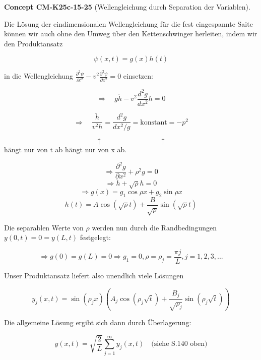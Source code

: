 \documentclass[10pt, letterpaper]{article}
\newcommand{\CustomHeading}[3]{%
  \par\medskip\noindent%
  \textbf{#1 #2} \textnormal{(#3)}.\enskip%
}
\newenvironment{CONC}[2]{\CustomHeading{Concept}{#1}{#2}}{}
\begin{document}
\begin{CONC}{CM-K25c-15-25}{Wellengleichung durch Separation der Variablen}
Die Lösung der eindimensionalen Wellengleichung für die fest eingespannte Saite können wir auch ohne den Umweg über den Kettenschwinger herleiten, indem wir den Produktansatz

\[\psi(x,t) = g(x)h(t)\]

in die Wellengleichung $\frac{\partial^2\psi}{\partial t^2} - v^2\frac{\partial^2\psi}{\partial x^2} = 0$ einsetzen:

\[\Rightarrow \quad g\ddot{h} - v^2\frac{d^2g}{dx^2}h = 0\]

\[\Rightarrow \quad \frac{\ddot{h}}{v^2h} = \frac{d^2g}{dx^2/g} = \text{konstant} = -p^2\]

\[\uparrow \qquad\qquad\qquad\qquad \uparrow\]
hängt nur von t ab \qquad hängt nur von x ab.

\[
\Rightarrow \frac{\partial^2 g}{\partial x^2} + \rho^2 g = 0
\]
\[
\Rightarrow \ddot{h} + \sqrt{\rho} h = 0
\]
\[
\Rightarrow g(x) = g_1 \cos \rho x + g_2 \sin \rho x
\]
\[
h(t) = A \cos(\sqrt{\rho}t) + \frac{B}{\sqrt{\rho}} \sin(\sqrt{\rho}t)
\]

Die separablen Werte von $\rho$ werden nun durch die Randbedingungen $y(0,t) = 0 = y(L,t)$ festgelegt:

\[
\Rightarrow g(0) = g(L) = 0 \Rightarrow g_1 = 0, \rho = \rho_j = \frac{\pi j}{L}, j=1,2,3,...
\]

Unser Produktansatz liefert also unendlich viele Lösungen

\[
y_j(x,t) = \sin(\rho_j x)\left(A_j \cos(\rho_j \sqrt{t}) + \frac{B_j}{\sqrt{\rho_j}} \sin(\rho_j \sqrt{t})\right)
\]

Die allgemeine Lösung ergibt sich dann durch Überlagerung:

\[
y(x,t) = \sqrt{\frac{2}{L}} \sum_{j=1}^{\infty} y_j(x,t) \quad \text{(siehe S.140 oben)}
\]
\end{CONC}
\end{document}
